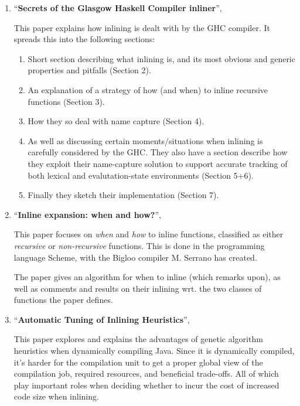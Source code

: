 \begin{enumerate}
	\item ``\textbf{Secrets of the Glasgow Haskell Compiler inliner}'',
\cite{GHC-paper}

This paper explains how inlining is dealt with by the GHC compiler. It spreads
this into the following sections:
\begin{enumerate}
	\item Short section describing what inlining is, and its most obvious and
generic properties and pitfalls (Section 2).
	\item An explanation of a strategy of how (and when) to inline recursive
functions (Section 3).
	\item How they so deal with name capture (Section 4).
	\item As well as discussing certain moments/situations when inlining is
carefully considered by the GHC. They also have a section describe how they
exploit their name-capture solution to support accurate tracking of both lexical
and evalutation-state environments (Section 5+6).
	\item Finally they sketch their implementation (Section 7).
\end{enumerate}

	\item ``\textbf{Inline expansion: when and how?}'',
\cite{InlineWhenHowSerrano}

This paper focuses on \textit{when} and \textit{how} to inline functions,
classified as either \textit{recursive} or \textit{non-recursive} functions.
This is done in the programming language Scheme, with the
Bigloo compiler M. Serrano has created.

The paper gives an algorithm for when to inline (which \cite{GHC-paper} remarks
upon), as well as comments and results on their inlining wrt. the two classes of
functions the paper defines.

	\item ``\textbf{Automatic Tuning of Inlining Heuristics}'',
\cite{AutoTuningJavaHeuristics}

This paper explores and explains the advantages of genetic algorithm  heuristics
when dynamically compiling Java. Since it is dynamically compiled, it's harder
for the compilation unit to get a proper global view of the compilation job,
required resources, and beneficial trade-offs. All of which play important roles
when deciding whether to incur the cost of increased code size when inlining.


\end{enumerate}
